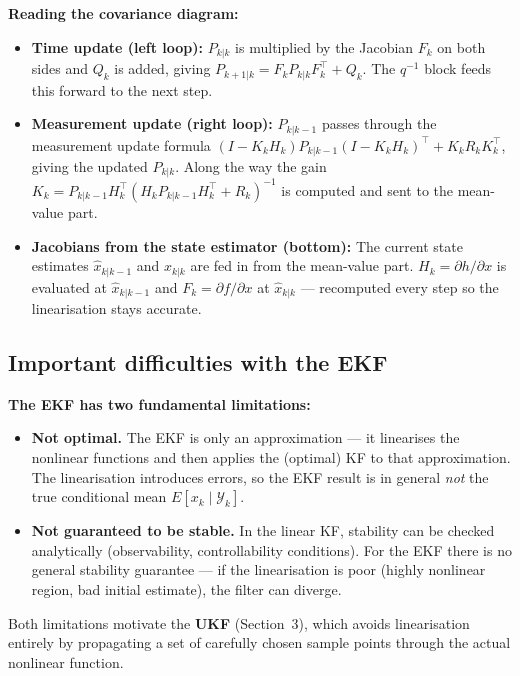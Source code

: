 \documentclass[12pt, a4paper]{article}
\begin{document}
\begin{notebox}
  \textbf{Reading the covariance diagram:}
  \begin{itemize}[leftmargin=1.4em, topsep=2pt]
    \item \textbf{Time update (left loop):}
          $P_{k|k}$ is multiplied by the Jacobian $F_k$ on both sides
          and $Q_k$ is added, giving $P_{k+1|k} = F_k P_{k|k} F_k^\top + Q_k$.
          The $q^{-1}$ block feeds this forward to the next step.
    \item \textbf{Measurement update (right loop):}
          $P_{k|k-1}$ passes through the measurement update formula
          $(I - K_k H_k)P_{k|k-1}(I-K_k H_k)^\top + K_k R_k K_k^\top$,
          giving the updated $P_{k|k}$.
          Along the way the gain
          $K_k = P_{k|k-1} H_k^\top(H_k P_{k|k-1} H_k^\top + R_k)^{-1}$
          is computed and sent to the mean-value part.
    \item \textbf{Jacobians from the state estimator (bottom):}
          The current state estimates $\hat{x}_{k|k-1}$ and
          $\hat{x}_{k|k}$ are fed in from the mean-value part.
          $H_k = \partial h/\partial x$ is evaluated at
          $\hat{x}_{k|k-1}$ and $F_k = \partial f/\partial x$ at
          $\hat{x}_{k|k}$ --- recomputed every step so the
          linearisation stays accurate.
  \end{itemize}
\end{notebox}

\subsection*{Important difficulties with the EKF}

\begin{warnbox}
  \textbf{The EKF has two fundamental limitations:}
  \begin{itemize}[leftmargin=1.4em, topsep=2pt]
    \item \textbf{Not optimal.}
          The EKF is only an approximation --- it linearises the
          nonlinear functions and then applies the (optimal) KF to
          that approximation.
          The linearisation introduces errors, so the EKF result is
          in general \emph{not} the true conditional mean
          $E[x_k \mid \mathcal{Y}_k]$.
    \item \textbf{Not guaranteed to be stable.}
          In the linear KF, stability can be checked analytically
          (observability, controllability conditions).
          For the EKF there is no general stability guarantee ---
          if the linearisation is poor (highly nonlinear region,
          bad initial estimate), the filter can diverge.
  \end{itemize}
  Both limitations motivate the \textbf{UKF} (Section~3), which
  avoids linearisation entirely by propagating a set of carefully
  chosen sample points through the actual nonlinear function.
\end{warnbox}
\end{document}
